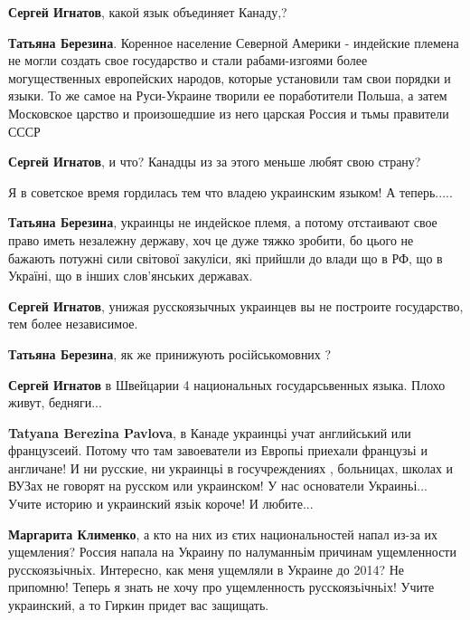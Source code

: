 \begin{itemize}

\textbf{Сергей Игнатов}, какой язык объединяет Канаду,?

\textbf{Татьяна Березина}. Коренное население Северной Америки - индейские
племена не могли создать свое государство и стали рабами-изгоями более
могущественных европейских народов, которые установили там свои порядки и
языки. То же самое на Руси-Украине творили ее поработители Польша, а затем
Московское царство и произошедшие из него царская Россия и тьмы правители СССР

\textbf{Сергей Игнатов}, и что? Канадцы из за этого меньше любят свою страну?

Я в советское время гордилась тем что владею украинским языком! А теперь.....

\textbf{Татьяна Березина}, украинцы не индейское племя, а потому отстаивают
свое право иметь незалежну державу, хоч це дуже тяжко зробити, бо цього не
бажають потужні сили світової закуліси, які прийшли до влади що в РФ, що в
Україні, що в інших слов'янських державах.

\textbf{Сергей Игнатов}, унижая русскоязычных украинцев вы не построите государство, тем более независимое.

\textbf{Татьяна Березина}, як же принижують російськомовних ?

\textbf{Сергей Игнатов} в Швейцарии 4 национальных государсьвенных языка. Плохо живут, бедняги...

\textbf{Tatyana Berezina Pavlova}, в Канаде украинцьі учат английський или
французсеий. Потому что там завоеватели из Европьі приехали французьі и
англичане! И ни русские, ни украинцьі в госучреждениях , больницах, школах и
ВУЗах не говорят на русском или украинском! У нас основатели Украиньі... Учите
историю и украинский язьік короче! И любите...

\textbf{Маргарита Клименко}, а кто на них из єтих национальностей напал из-за
их ущемления? Россия напала на Украину по налуманньім причинам ущемленности
русскоязьічньіх. Интересно, как меня ущемляли в Украине до 2014? Не припомню!
Теперь я знать не хочу про ущемленность русскоязьічньіх! Учите украинский, а то
Гиркин придет вас защищать.


\end{itemize}
